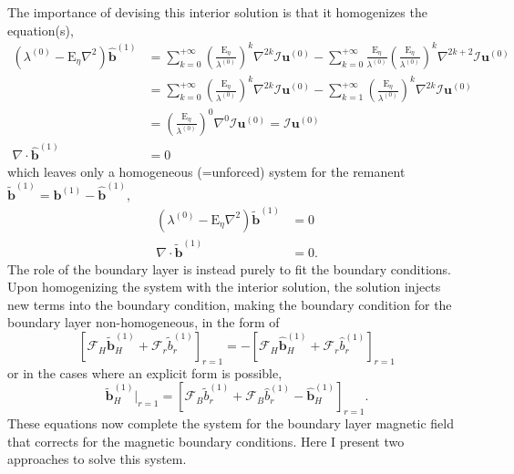 The importance of devising this interior solution is that it homogenizes the equation(s),
%
\begin{equation}
\begin{aligned}
    \left(\lambda^{(0)} - \mathrm{E}_\eta \nabla^2\right) \widehat{\mathbf{b}}^{(1)} &= \sum_{k=0}^{+\infty} \left(\frac{\mathrm{E}_\eta}{\lambda^{(0)}}\right)^k \nabla^{2k} \mathcal{I}\mathbf{u}^{(0)} - \sum_{k=0}^{+\infty} \frac{\mathrm{E}_\eta}{\lambda^{(0)}} \left(\frac{\mathrm{E}_\eta}{\lambda^{(0)}}\right)^k \nabla^{2k+2} \mathcal{I}\mathbf{u}^{(0)} \\ 
    &= \sum_{k=0}^{+\infty} \left(\frac{\mathrm{E}_\eta}{\lambda^{(0)}}\right)^k \nabla^{2k} \mathcal{I}\mathbf{u}^{(0)} - \sum_{k=1}^{+\infty} \left(\frac{\mathrm{E}_\eta}{\lambda^{(0)}}\right)^k \nabla^{2k} \mathcal{I}\mathbf{u}^{(0)} \\
    &= \left(\frac{\mathrm{E}_\eta}{\lambda^{(0)}}\right)^0 \nabla^{0} \mathcal{I}\mathbf{u}^{(0)} = \mathcal{I} \mathbf{u}^{(0)} \\ 
    \nabla\cdot \widehat{\mathbf{b}}^{(1)} &= 0
\end{aligned}
\end{equation}
%
which leaves only a homogeneous (=unforced) system for the remanent $\widetilde{\mathbf{b}}^{(1)} = \mathbf{b}^{(1)} - \widehat{\mathbf{b}}^{(1)}$,
%
\begin{equation}
\begin{aligned}
    \left(\lambda^{(0)} - \mathrm{E}_\eta \nabla^2\right) \widetilde{\mathbf{b}}^{(1)} &= 0 \\ 
    \nabla\cdot \widetilde{\mathbf{b}}^{(1)} &= 0.
\end{aligned}
\end{equation}
%
The role of the boundary layer is instead purely to fit the boundary conditions. Upon homogenizing the system with the interior solution, the solution injects new terms into the boundary condition, making the boundary condition for the boundary layer non-homogeneous, in the form of
%
\begin{equation}
    \left[\mathcal{F}_H \widetilde{\mathbf{b}}^{(1)}_H + \mathcal{F}_r \widetilde{b}_r^{(1)}\right]_{r=1} = - \left[\mathcal{F}_H \widehat{\mathbf{b}}^{(1)}_H + \mathcal{F}_r \widehat{b}_r^{(1)}\right]_{r=1}
\end{equation}
%
or in the cases where an explicit form is possible,
%
\begin{equation}
    \widetilde{\mathbf{b}}_H^{(1)}|_{r=1} = \left[\mathcal{F}_B \widetilde{b}_r^{(1)} + \mathcal{F}_B \widehat{b}_r^{(1)} - \widehat{\mathbf{b}}_H^{(1)}\right]_{r=1}.
\end{equation}
%
These equations now complete the system for the boundary layer magnetic field that corrects for the magnetic boundary conditions. Here I present two approaches to solve this system.


